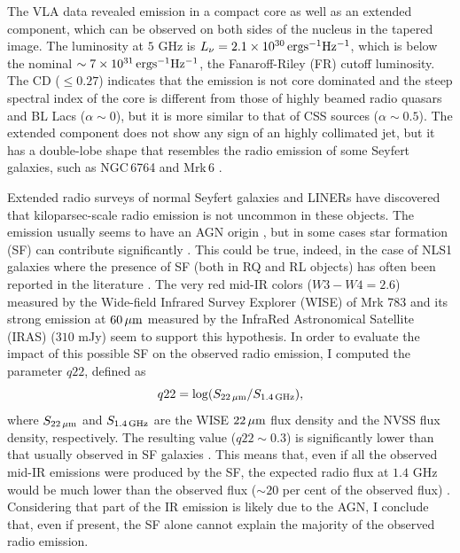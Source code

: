 \documentclass[../main.tex]{subfiles}
\begin{document}
The VLA data revealed emission in a compact core as well as an extended component, which can be observed on both sides of the nucleus in the tapered image.
The luminosity at $5$ GHz is $L_{\nu}=2.1\times10^{30}\,{\rm erg s^{-1} Hz^{-1}}$, which is below the nominal $\sim 7\times10^{31}\,{\rm erg s^{-1} Hz^{-1}}$, the Fanaroff-Riley (FR) cutoff luminosity. 
The CD ($\leq 0.27$) indicates that the emission is not core dominated and the steep spectral index of the core is different from those of highly beamed radio quasars and BL Lacs ($\alpha \sim 0$), but it is more similar to that of CSS sources ($\alpha \sim 0.5$).
The extended component does not show any sign of an highly collimated jet, but it has a double-lobe shape that resembles the radio emission of some Seyfert galaxies, such as NGC\,6764 \citep{Hota06} and Mrk\,6 \citep{Kharb06}.

Extended radio surveys of normal Seyfert galaxies and LINERs \citep[e.g.,][]{Baum93,Gallimore06,Singh15} have discovered that kiloparsec-scale radio emission is not uncommon in these objects. 
The emission usually seems to have an AGN origin \citep{Gallimore06,Singh15}, but in some cases star formation (SF) can  contribute significantly \citep[e.g.,][]{Baum93}.
This could be true, indeed, in the case of NLS1 galaxies where the presence of SF (both in RQ and RL objects) has often been reported in the literature \citep[e.g.,][]{Sani10,Caccianiga15}.
The very red mid-IR colors ($W3-W4=2.6$) measured by the Wide-field Infrared Survey Explorer (WISE) of Mrk 783 and its strong emission at $60\,{\rm\mu m}$ measured by the InfraRed Astronomical Satellite (IRAS) ($310$ mJy) seem to support this hypothesis. 
In order to evaluate the impact of this possible SF on the observed radio emission, I computed the parameter $q22$, defined as\begin{equation}
\label{eq:q22}
q22 = \log (S_{22\,{\rm \mu m}}/S_{1.4\,{\rm GHz}}),
\end{equation}
where $S_{22\,{\rm \mu m}}$ and $S_{1.4\,{\rm GHz}}$ are the WISE $22\,{\rm \mu m}$ flux density and the NVSS flux density, respectively.
The resulting value ($q22\sim0.3$) is significantly lower than that usually observed in SF galaxies \citep[$q22>1$;][]{Caccianiga15}. 
This means that, even if all the observed mid-IR emissions were produced by the SF, the expected radio flux at $1.4$ GHz would be much lower than the observed flux ($\sim20$ per cent of the observed flux) . 
Considering that part of the IR emission is likely due to the AGN, I conclude that, even if present, the SF alone cannot explain the majority of the observed radio emission.
\end{document}
